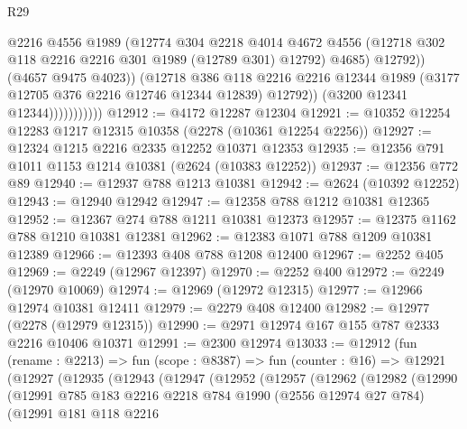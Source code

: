 \begin{lexlean}{R29}
\begin{coremodule}
                                @2216
                                @4556
                                @1989
                                (@12774
                                  @304
                                  @2218
                                  @4014
                                  @4672
                                  @4556
                                  (@12718 @302 @118 @2216 @2216 @301 @1989 (@12789 @301) @12792)
                                  @4685)
                                @12792))
                            (@4657 @9475 @4023))
                          (@12718
                            @386
                            @118
                            @2216
                            @2216
                            @12344
                            @1989
                            (@3177 @12705 @376 @2216 @12746 @12344 @12839)
                            @12792))
                        (@3200 @12341 @12344)))))))))))
@12912 := @4172 @12287 @12304
@12921 := @10352 @12254 @12283 @1217 @12315 @10358 (@2278 (@10361 @12254 @2256))
@12927 := @12324 @1215 @2216 @2335 @12252 @10371 @12353
@12935 := @12356 @791 @1011 @1153 @1214 @10381 (@2624 (@10383 @12252))
@12937 := @12356 @772 @89
@12940 := @12937 @788 @1213 @10381
@12942 := @2624 (@10392 @12252)
@12943 := @12940 @12942
@12947 := @12358 @788 @1212 @10381 @12365
@12952 := @12367 @274 @788 @1211 @10381 @12373
@12957 := @12375 @1162 @788 @1210 @10381 @12381
@12962 := @12383 @1071 @788 @1209 @10381 @12389
@12966 := @12393 @408 @788 @1208 @12400
@12967 := @2252 @405
@12969 := @2249 (@12967 @12397)
@12970 := @2252 @400
@12972 := @2249 (@12970 @10069)
@12974 := @12969 (@12972 @12315)
@12977 := @12966 @12974 @10381 @12411
@12979 := @2279 @408 @12400
@12982 := @12977 (@2278 (@12979 @12315))
@12990 := @2971 @12974 @167 @155 @787 @2333 @2216 @10406 @10371
@12991 := @2300 @12974
@13033 := @12912
    (fun (rename : @2213) =>
    fun (scope : @8387) =>
    fun (counter : @16) =>
    @12921
      (@12927
        (@12935
          (@12943
            (@12947
              (@12952
                (@12957
                  (@12962
                    (@12982
                      (@12990
                        (@12991
                          @785
                          @183
                          @2216
                          @2218
                          @784
                          @1990
                          (@2556 @12974 @27 @784)
                          (@12991
                            @181
                            @118
                            @2216

\end{coremodule}
\end{lexlean}
